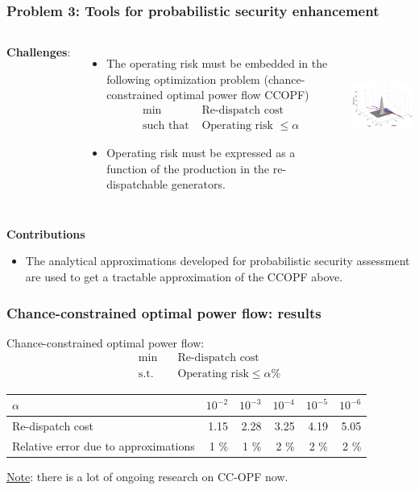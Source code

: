 \documentclass{beamer}
\begin{document}
\begin{frame}
  \frametitle{Problem 3: Tools for probabilistic security enhancement}
  \begin{columns}
  \textbf{Challenges}:
  \begin{itemize}
  \item The operating risk must be embedded in the following optimization problem (chance-constrained optimal power flow CCOPF)
    \begin{align*}
      \min & \text{ Re-dispatch cost} \\
      \text{such that} & \text{ Operating risk } \leq \alpha
    \end{align*}
  \item Operating risk must be expressed as a function of the production in the re-dispatchable generators.
  \end{itemize}
\includegraphics[height=4cm,width=1.5\textwidth]{Figs/KarysStbBdAndForcast3D-2}
  \end{columns}
\vskip0.2cm
\textbf{Contributions}
\begin{itemize}
\item The analytical approximations developed for probabilistic security assessment are used to get a tractable approximation of the CCOPF above.
\end{itemize} 
\end{frame}

\begin{frame}
\frametitle{Chance-constrained optimal power flow: results}
\begin{block}{}
Chance-constrained optimal power flow:
\begin{align*}
  \min \quad & \text{Re-dispatch cost} \\ 
  \text{s.t.} \quad & \text{Operating risk} \leq \alpha \%
\end{align*}
\end{block}
\begin{center}
\begin{tabular}{>{\raggedright\arraybackslash}p{4cm}rrrrr}
  \toprule
   $\alpha$ & $10^{-2}$ & $10^{-3}$ & $10^{-4}$ & $10^{-5}$ & $10^{-6}$\\
   \midrule
 Re-dispatch cost & 1.15 & 2.28 & 3.25 & 4.19 & 5.05 \\
\midrule
 Relative error due to approximations & 1 \% &  1 \% & 2 \%& 2 \%& 2 \%\\
  \bottomrule
\end{tabular}
\end{center}
\underline{Note}: there is a lot of ongoing research on CC-OPF now.
\end{frame}
\end{document}
